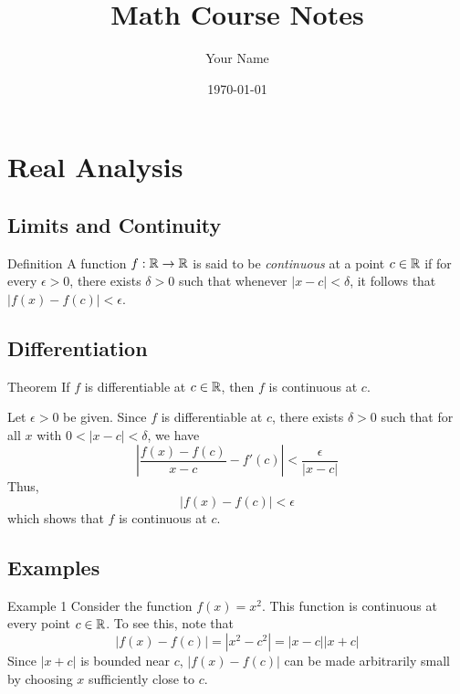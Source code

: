 \documentclass{article}
\title{Math Course Notes}
\author{Your Name}
\date{\today}
\begin{document}
\maketitle

\section*{Real Analysis}
\subsection*{Limits and Continuity}
\begin{mydefinition}{Definition}
A function \( f: \mathbb{R} \to \mathbb{R} \) is said to be \textit{continuous} at a point \( c \in \mathbb{R} \) if for every \( \epsilon > 0 \), there exists \( \delta > 0 \) such that whenever \( |x - c| < \delta \), it follows that \( |f(x) - f(c)| < \epsilon \).
\end{mydefinition}

\subsection*{Differentiation}
\begin{mytheorem}{Theorem}
If \( f \) is differentiable at \( c \in \mathbb{R} \), then \( f \) is continuous at \( c \).
\end{mytheorem}
\begin{myproof}
Let \( \epsilon > 0 \) be given. Since \( f \) is differentiable at \( c \), there exists \( \delta > 0 \) such that for all \( x \) with \( 0 < |x - c| < \delta \), we have
\[
\left| \frac{f(x) - f(c)}{x - c} - f'(c) \right| < \frac{\epsilon}{|x - c|}
\]
Thus,
\[
|f(x) - f(c)| < \epsilon
\]
which shows that \( f \) is continuous at \( c \).
\end{myproof}

\subsection*{Examples}
\begin{myexample}{Example 1}
Consider the function \( f(x) = x^2 \). This function is continuous at every point \( c \in \mathbb{R} \). To see this, note that
\[
|f(x) - f(c)| = |x^2 - c^2| = |x - c||x + c|
\]
Since \( |x + c| \) is bounded near \( c \), \( |f(x) - f(c)| \) can be made arbitrarily small by choosing \( x \) sufficiently close to \( c \).
\end{myexample}
\end{document}
